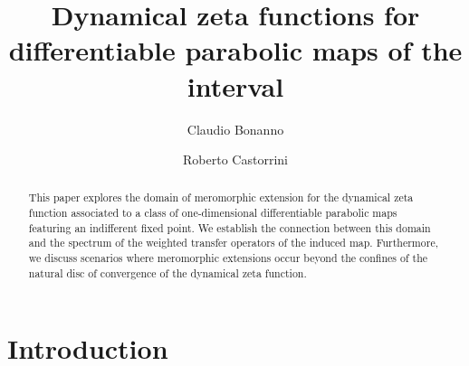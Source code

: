 \documentclass[11pt]{amsart}
\theoremstyle{definition}
\theoremstyle{remark}
\theoremstyle{definition}
\numberwithin{equation}{section}
\newcommand{\alert}[1]{\textcolor{red}{\textbf{#1}}}
\begin{document}
\title[]{Dynamical zeta functions for differentiable parabolic maps of the interval}
\author{Claudio Bonanno}
\address{Dipartimento di Matematica, Universit\`a di Pisa, Largo Bruno Pontecorvo 5, 56127 Pisa, Italy}

\author{Roberto Castorrini}
\address{Scuola Normale Superiore, Piazza dei Cavalieri 7, 56126 Pisa, Italy}


\begin{abstract}
This paper explores the domain of meromorphic extension for the dynamical zeta function associated to a class of one-dimensional differentiable parabolic maps featuring an indifferent fixed point. We establish the connection between this domain and the spectrum of the weighted transfer operators of the induced map. Furthermore, we discuss scenarios where meromorphic extensions occur beyond the confines of the natural disc of convergence of the dynamical zeta function.
\end{abstract}
\maketitle

\section{Introduction} \label{sec:intro}

\end{document}
